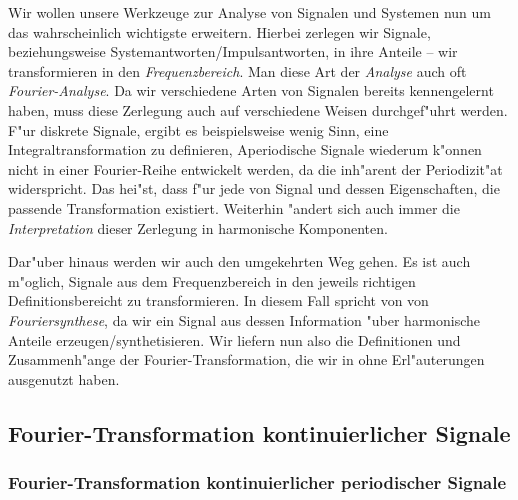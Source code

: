 Wir wollen unsere Werkzeuge zur Analyse von Signalen und Systemen nun um das wahrscheinlich wichtigste erweitern.
Hierbei zerlegen wir Signale, beziehungsweise Systemantworten/Impulsantworten, in ihre  Anteile -- wir transformieren in den \emph{Frequenzbereich}.
Man diese Art der \emph{Analyse} auch oft \emph{Fourier-Analyse}.
Da wir verschiedene Arten von Signalen bereits kennengelernt haben, muss diese Zerlegung auch auf verschiedene Weisen durchgef"uhrt werden.
F"ur diskrete Signale, ergibt es beispielsweise wenig Sinn, eine Integraltransformation zu definieren, Aperiodische Signale wiederum k"onnen nicht in einer Fourier-Reihe entwickelt werden, da die inh"arent der Periodizit"at widerspricht.
Das hei"st, dass f"ur jede  von Signal und dessen Eigenschaften, die passende Transformation existiert.
Weiterhin "andert sich auch immer die \emph{Interpretation} dieser Zerlegung in harmonische Komponenten.

Dar"uber hinaus werden wir auch den umgekehrten Weg gehen.
Es ist auch m"oglich, Signale aus dem Frequenzbereich in den jeweils richtigen Definitionsbereicht zu transformieren. 
In diesem Fall spricht von von \emph{Fouriersynthese}, da wir ein Signal aus dessen Information "uber harmonische Anteile erzeugen/synthetisieren.
Wir liefern nun also die Definitionen und Zusammenh"ange der Fourier-Transformation, die wir in  ohne Erl"auterungen ausgenutzt haben.

\subsection{Fourier-Transformation kontinuierlicher Signale}\label{sec:fourier:cont}

\subsubsection{Fourier-Transformation kontinuierlicher periodischer Signale}\label{sec:fourier:cont:period}

